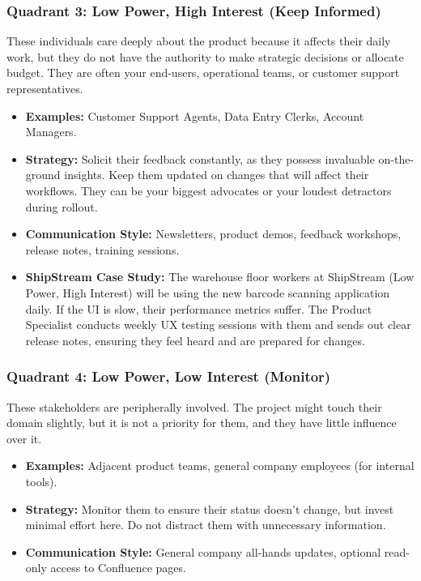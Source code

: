 \documentclass[
  11pt,
  openany,
  oneside]{book}
\providecommand{\tightlist}{%
  \setlength{\itemsep}{0pt}\setlength{\parskip}{0pt}}
\begin{document}
\subsubsection{Quadrant 3: Low Power, High Interest (Keep
Informed)}\label{quadrant-3-low-power-high-interest-keep-informed}

These individuals care deeply about the product because it affects their
daily work, but they do not have the authority to make strategic
decisions or allocate budget. They are often your end-users, operational
teams, or customer support representatives.

\begin{itemize}
\tightlist
\item
  \textbf{Examples:} Customer Support Agents, Data Entry Clerks, Account
  Managers.
\item
  \textbf{Strategy:} Solicit their feedback constantly, as they possess
  invaluable on-the-ground insights. Keep them updated on changes that
  will affect their workflows. They can be your biggest advocates or
  your loudest detractors during rollout.
\item
  \textbf{Communication Style:} Newsletters, product demos, feedback
  workshops, release notes, training sessions.
\item
  \textbf{ShipStream Case Study:} The warehouse floor workers at
  ShipStream (Low Power, High Interest) will be using the new barcode
  scanning application daily. If the UI is slow, their performance
  metrics suffer. The Product Specialist conducts weekly UX testing
  sessions with them and sends out clear release notes, ensuring they
  feel heard and are prepared for changes.
\end{itemize}

\subsubsection{Quadrant 4: Low Power, Low Interest
(Monitor)}\label{quadrant-4-low-power-low-interest-monitor}

These stakeholders are peripherally involved. The project might touch
their domain slightly, but it is not a priority for them, and they have
little influence over it.

\begin{itemize}
\tightlist
\item
  \textbf{Examples:} Adjacent product teams, general company employees
  (for internal tools).
\item
  \textbf{Strategy:} Monitor them to ensure their status doesn't change,
  but invest minimal effort here. Do not distract them with unnecessary
  information.
\item
  \textbf{Communication Style:} General company all-hands updates,
  optional read-only access to Confluence pages.
\end{itemize}
\end{document}
